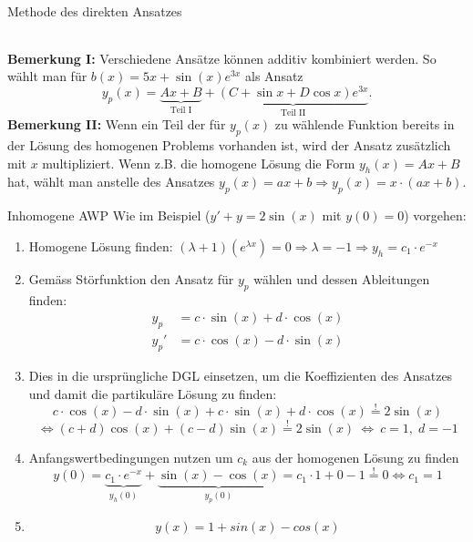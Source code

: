 \begin{Rezept}{Methode des direkten Ansatzes}{}
\begin{center}
\begin{tabular}{l|l}
			\hline 
		\end{tabular} 
	\end{center}
	\textbf{Bemerkung I:} Verschiedene Ansätze können additiv kombiniert werden. So wählt man für $b(x)=5x + \sin(x)e^{3x}$ als Ansatz
	\begin{equation*}
	y_p(x) = \underbrace{Ax + B}_{\text{Teil I}} + \underbrace{(C+\sin x + D \cos x)e^{3x}}_\text{Teil II}.
	\end{equation*}
	\textbf{Bemerkung II:} Wenn ein Teil der für $y_p(x)$ zu wählende Funktion bereits in der Lösung des homogenen Problems vorhanden ist, wird der Ansatz zusätzlich mit $x$ multipliziert. Wenn z.B. die homogene Lösung die Form $y_h(x) = Ax + B$ hat, wählt man anstelle des Ansatzes $y_p(x) = ax+b \Rightarrow y_p(x) = x\cdot(ax+b)$.
\end{Rezept}

\begin{Rezept}{Inhomogene AWP}{}
    Wie im Beispiel ($y' + y = 2\sin(x)$ mit $y(0)=0$) vorgehen:
	\begin{enumerate}
	    \item { Homogene Lösung finden: $(\lambda+1)(e^{\lambda x}) = 0 \Rightarrow \lambda = -1 \Rightarrow y_h = c_1 \cdot e^{-x}$ }
	    \item { Gemäss Störfunktion den Ansatz für $y_p$ wählen und dessen
            Ableitungen finden:
            \begin{align*}
              y_p & = c\cdot \sin(x) + d\cdot \cos(x)\\
              y_p' & = c\cdot \cos(x) - d\cdot \sin(x) 
            \end{align*}
	        }
	    \item { Dies in die ursprüngliche DGL einsetzen, um die Koeffizienten des Ansatzes und damit die partikuläre Lösung zu finden:
	       \[ c \cdot \cos(x) - d\cdot \sin(x) + c\cdot \sin(x) + d\cdot \cos(x) \stackrel{!}{=} 2\sin(x)\] \[ \Leftrightarrow (c+d) \cos(x) + (c-d) \sin(x) \stackrel{!}{=} 2\sin(x) ~ \Longleftrightarrow ~ c=1,\;d=-1 \]
	    }
	    \item{
	        Anfangswertbedingungen nutzen um $c_k$ aus der homogenen Lösung zu finden
	        \[ y(0) = \underbrace{c_1 \cdot e^{-x}}_{y_h(0)} + \underbrace{\sin(x)-\cos(x)}_{y_p(0)} = c_1\cdot1 + 0 - 1 \stackrel{!}{=} 0 \Leftrightarrow c_1 = 1 \]
	    }
	    \item{
	        \[ y(x) = 1 + sin(x) - cos(x) \] 
	   }
	\end{enumerate}
\end{Rezept}

